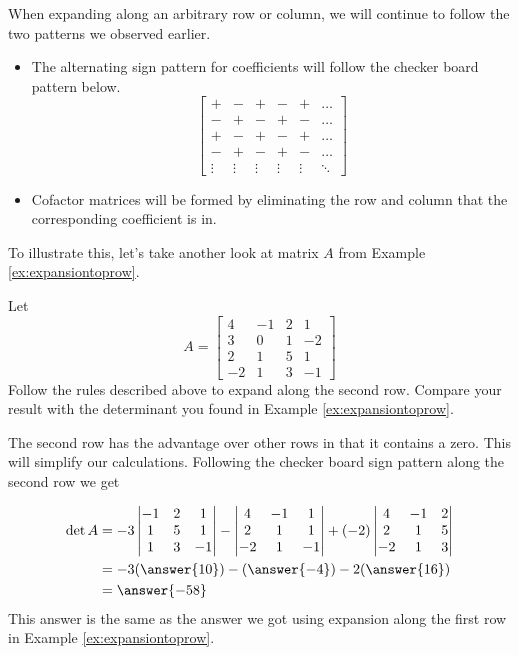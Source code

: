 \documentclass{ximera}
\begin{document}
When expanding along an arbitrary row or column, we will continue to follow the two patterns we observed earlier.
\begin{itemize}
    \item The alternating sign pattern for coefficients will follow the checker board pattern below.
 $$\begin{bmatrix}+&-&+&-&+&\ldots\\-&+&-&+&-&\ldots\\
 +&-&+&-&+&\ldots\\-&+&-&+&-&\ldots\\\vdots &\vdots  & \vdots & \vdots &\vdots &\ddots \end{bmatrix}$$
 \item Cofactor matrices will be formed by eliminating the row and column that the corresponding coefficient is in.
\end{itemize}

To illustrate this, let's take another look at matrix $A$ from Example \ref{ex:expansiontoprow}. 


 \begin{example}\label{ex:laplace1}
Let  
$$A=\begin{bmatrix}4&-1&2&1\\3&0&1&-2\\
2&1&5&1\\-2&1&3&-1\end{bmatrix}$$
Follow the rules described above to expand along the second row.  Compare your result with the determinant you found in Example \ref{ex:expansiontoprow}.
\begin{explanation}

 The second row has the advantage over other rows in that it contains a zero.  This will simplify our calculations.  Following the checker board sign pattern along the second row we get

\begin{align*}
\det{A}
&=-3\begin{vmatrix}-1&2&1\\1&5&1\\1&3&-1\end{vmatrix}-\begin{vmatrix}4&-1&1\\2&1&1\\-2&1&-1\end{vmatrix}+(-2)\begin{vmatrix}4&-1&2\\2&1&5\\-2&1&3\end{vmatrix}\\&=-3(\answer{10})-(\answer{-4})-2(\answer{16})\\
&=\answer{-58}
\end{align*}
This answer is the same as the answer we got using expansion along the first row in Example \ref{ex:expansiontoprow}.
    
\end{explanation}
 \end{example}
 
\end{document}
